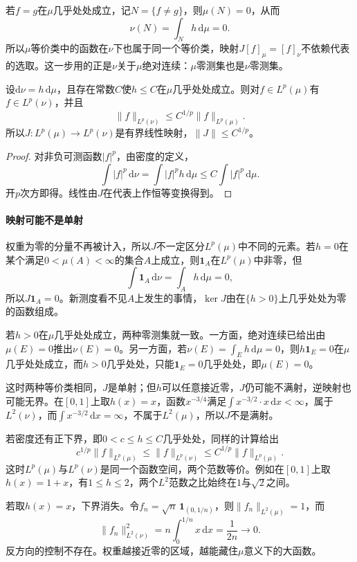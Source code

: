 若$f=g$在$\mu$几乎处处成立，记$N=\{f\neq g\}$，则$\mu(N)=0$，从而
\[
 \nu(N)=\int_Nh\,\mathrm d\mu=0.
\]
所以$\mu$等价类中的函数在$\nu$下也属于同一个等价类，映射$J[f]_\mu=[f]_\nu$不依赖代表的选取。这一步用的正是$\nu$关于$\mu$绝对连续：$\mu$零测集也是$\nu$零测集。

\begin{theorem}[有界密度给出有界映射]
\label{thm:lop-change-of-measure}
设$\mathrm d\nu=h\,\mathrm d\mu$，且存在常数$C$使$h\leq C$在$\mu$几乎处处成立。则对$f\in L^p(\mu)$有$f\in L^p(\nu)$，并且
\begin{equation}
 \lVert f\rVert_{L^p(\nu)}\leq C^{1/p}\lVert f\rVert_{L^p(\mu)} .
 \label{eq:lop-change-of-measure}
\end{equation}
所以$J:L^p(\mu)\to L^p(\nu)$是有界线性映射，$\lVert J\rVert\leq C^{1/p}$。
\end{theorem}

\begin{proof}
对非负可测函数$\lvert f\rvert^p$，由密度的定义，
\[
 \int\lvert f\rvert^p\,\mathrm d\nu=\int\lvert f\rvert^ph\,\mathrm d\mu\leq C\int\lvert f\rvert^p\,\mathrm d\mu.
\]
开$p$次方即得。线性由$J$在代表上作恒等变换得到。
\end{proof}

\paragraph{映射可能不是单射}
权重为零的分量不再被计入，所以$J$不一定区分$L^p(\mu)$中不同的元素。若$h=0$在某个满足$0<\mu(A)<\infty$的集合$A$上成立，则$\mathbf 1_A$在$L^p(\mu)$中非零，但
\[
 \int\mathbf 1_A\,\mathrm d\nu=\int_Ah\,\mathrm d\mu=0,
\]
所以$J\mathbf 1_A=0$。新测度看不见$A$上发生的事情，$\ker J$由在$\{h>0\}$上几乎处处为零的函数组成。

若$h>0$在$\mu$几乎处处成立，两种零测集就一致。一方面，绝对连续已给出由$\mu(E)=0$推出$\nu(E)=0$。另一方面，若$\nu(E)=\int_Eh\,\mathrm d\mu=0$，则$h\mathbf 1_E=0$在$\mu$几乎处处成立，而$h>0$几乎处处，只能$\mathbf 1_E=0$几乎处处，即$\mu(E)=0$。

这时两种等价类相同，$J$是单射；但$h$可以任意接近零，$J$仍可能不满射，逆映射也可能无界。在$[0,1]$上取$h(x)=x$，函数$x^{-3/4}$满足$\int x^{-3/2}\cdot x\,\mathrm dx<\infty$，属于$L^2(\nu)$，而$\int x^{-3/2}\,\mathrm dx=\infty$，不属于$L^2(\mu)$，所以$J$不是满射。

若密度还有正下界，即$0<c\leq h\leq C$几乎处处，同样的计算给出
\begin{equation}
 c^{1/p}\lVert f\rVert_{L^p(\mu)}\leq\lVert f\rVert_{L^p(\nu)}\leq C^{1/p}\lVert f\rVert_{L^p(\mu)} .
 \label{eq:lop-measure-equivalence}
\end{equation}
这时$L^p(\mu)$与$L^p(\nu)$是同一个函数空间，两个范数等价。例如在$[0,1]$上取$h(x)=1+x$，有$1\leq h\leq2$，两个$L^2$范数之比始终在$1$与$\sqrt2$之间。

若取$h(x)=x$，下界消失。令$f_n=\sqrt n\,\mathbf 1_{(0,1/n)}$，则$\lVert f_n\rVert_{L^2(\mu)}=1$，而
\[
 \lVert f_n\rVert_{L^2(\nu)}^2=n\int_0^{1/n}x\,\mathrm dx=\frac1{2n}\to0.
\]
反方向的控制不存在。权重越接近零的区域，越能藏住$\mu$意义下的大函数。
